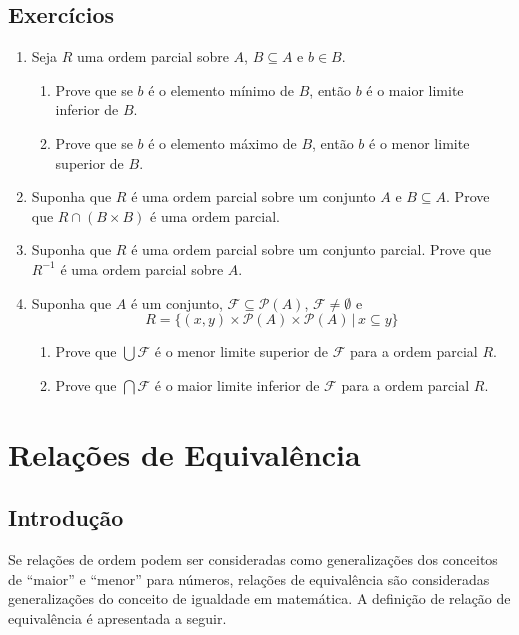 \subsection{Exercícios}

\begin{enumerate}
	\item Seja $R$ uma ordem parcial sobre $A$, $B\subseteq A$ e $b\in B$.
	\begin{enumerate}
		\item Prove que se $b$ \'e o elemento m\'inimo de $B$, ent\~ao $b$ \'e o maior limite inferior de $B$.
		\item Prove que se $b$ \'e o elemento m\'aximo de $B$, ent\~ao $b$ \'e o menor limite superior de $B$.
	\end{enumerate}
        \item Suponha que $R$ é uma ordem parcial sobre um conjunto
          $A$ e $B \subseteq A$. Prove que $R \cap (B \times B)$ é uma
          ordem parcial.
        \item Suponha que $R$ é uma ordem parcial sobre um conjunto
          parcial. Prove que $R^{-1}$ é uma ordem parcial sobre $A$.
        \item Suponha que $A$ é um conjunto, $\mathcal{F}\subseteq
          \mathcal{P}(A)$, $\mathcal{F}\neq \emptyset$ e \[R =
          \{(x,y)\times \mathcal{P}(A) \times
          \mathcal{P}(A)\,|\,x\subseteq y\}\]
        \begin{enumerate}
          \item Prove que $\bigcup \mathcal{F}$ é o menor limite
            superior de $\mathcal{F}$ para a ordem parcial $R$.
          \item Prove que $\bigcap \mathcal{F}$ é o maior limite
            inferior de $\mathcal{F}$ para a ordem parcial $R$.
        \end{enumerate}
\end{enumerate}


\section{Relações de Equivalência}

\subsection{Introdução}

Se relações de ordem podem ser consideradas como generalizações dos
conceitos de ``maior'' e ``menor'' para números, relações de
equivalência são consideradas generalizações do conceito de igualdade
em matemática. A definição de relação de equivalência é apresentada a
seguir.


